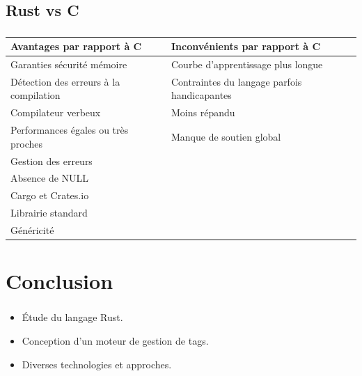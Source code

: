 \documentclass[10pt]{beamer}
\begin{document}
\subsection{Rust vs C}
\begin{frame}
    \frametitle{\subsecname}
    \begin{center}
        \begin{tabularx}{11cm}{|X|X|} \hline
            \textbf{Avantages par rapport à C} & \textbf{Inconvénients par rapport à C} \\ \hline
            Garanties sécurité mémoire & Courbe d'apprentissage plus longue \\ \hline
            Détection des erreurs à la compilation & Contraintes du langage parfois handicapantes \\ \hline
            Compilateur verbeux & Moins répandu \\ \hline
            Performances égales ou très proches & Manque de soutien global \\ \hline
            Gestion des erreurs &  \\ \hline
            Absence de NULL &  \\ \hline
            Cargo et Crates.io &  \\ \hline
            Librairie standard &  \\ \hline
            Généricité &  \\ \hline
        \end{tabularx}
    \end{center}
\end{frame}

\section{Conclusion}
\begin{frame}
    \frametitle{\secname}
    \begin{itemize}
        \item Étude du langage Rust.
        \item Conception d'un moteur de gestion de tags.
        \item Diverses technologies et approches.
    \end{itemize}
\end{frame}
\end{document}
